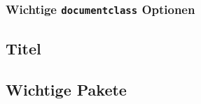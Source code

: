 \subsubsection{Wichtige \texttt{documentclass} Optionen}

\subsection{Titel}

\subsection{Wichtige Pakete}

\newpage